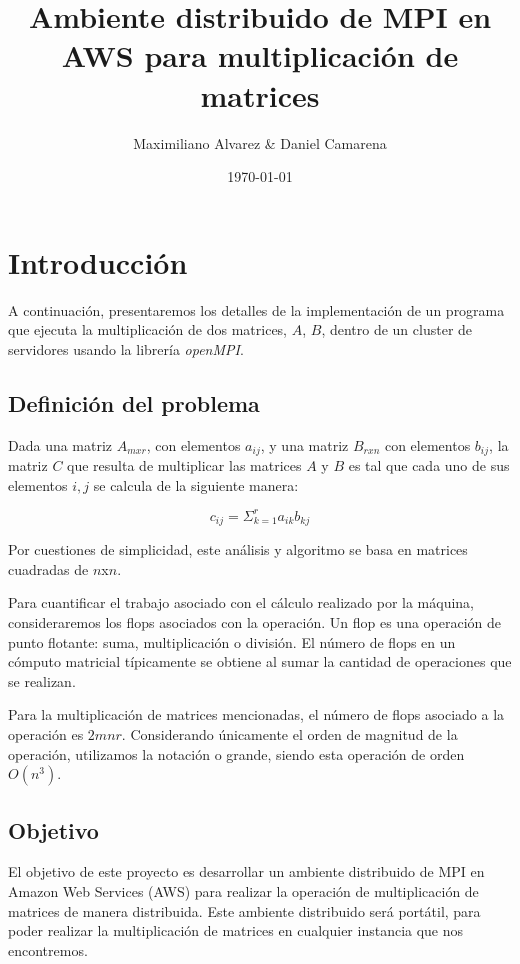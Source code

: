 \documentclass[DIV=calc, paper=letter, fontsize=11pt, twocolumn]{scrartcl}
\title{\Huge Ambiente distribuido de MPI en AWS para multiplicación de matrices}
\author{	Maximiliano Alvarez
			\& 
			Daniel Camarena }
\date{\today}
\begin{document}
\maketitle

\thispagestyle{fancy}


\section{Introducción}
A continuación, presentaremos los detalles de la implementación de un programa que ejecuta la multiplicación de dos matrices, $A$, $B$, dentro de un cluster de servidores usando la librería \textit{openMPI}.

\subsection{Definición del problema}

Dada una matriz $A_{mxr}$, con elementos $a_{ij}$, y una matriz $B_{rxn}$ con elementos $b_{ij}$, la matriz $C$ que resulta de multiplicar las matrices $A$ y $B$ es tal que cada uno de sus elementos $i,j$ se calcula de la siguiente manera:

\begin{equation}
    c_{ij}=\Sigma_{k=1}^ra_{ik}b_{kj}
\end{equation}

Por cuestiones de simplicidad, este análisis y algoritmo se basa en matrices cuadradas de $n$x$n$.

Para cuantificar el trabajo asociado con el cálculo realizado por la máquina, consideraremos los flops asociados con la operación. Un flop es una operación de punto flotante: suma, multiplicación o división. El número de flops en un cómputo matricial típicamente se obtiene al sumar la cantidad de operaciones que se realizan.

Para la multiplicación de matrices mencionadas, el número de flops asociado a la operación es $2mnr$. Considerando únicamente el orden de magnitud de la operación, utilizamos la notación o grande, siendo esta operación de orden $O(n^3)$.

\subsection{Objetivo}

El objetivo de este proyecto es desarrollar un ambiente distribuido de MPI en Amazon Web Services (AWS) para realizar la operación de multiplicación de matrices de manera distribuida. Este ambiente distribuido será portátil, para poder realizar la multiplicación de matrices en cualquier instancia que nos encontremos.
\end{document}
